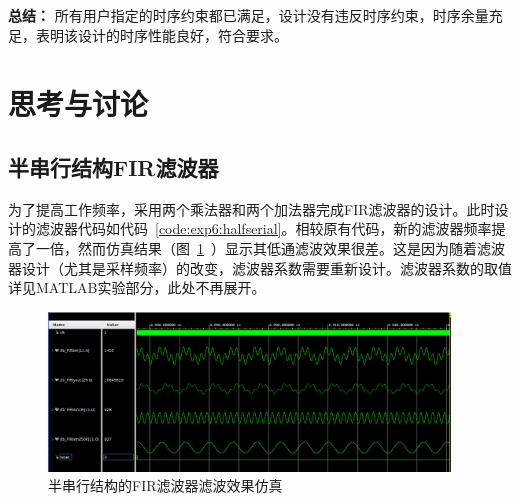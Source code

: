 \textbf{总结：}  
所有用户指定的时序约束都已满足，设计没有违反时序约束，时序余量充足，表明该设计的时序性能良好，符合要求。

\section{思考与讨论}
\subsection{半串行结构FIR滤波器}
为了提高工作频率，采用两个乘法器和两个加法器完成FIR滤波器的设计。此时设计的滤波器代码如代码~\ref{code:exp6:halfserial}。相较原有代码，新的滤波器频率提高了一倍，然而仿真结果（图~\ref{fig:half_serial}~）显示其低通滤波效果很差。这是因为随着滤波器设计（尤其是采样频率）的改变，滤波器系数需要重新设计。滤波器系数的取值详见MATLAB实验部分，此处不再展开。
\begin{figure}[htbp]
    \centering
    \includegraphics[width=0.95\textwidth]{figure/exp6/waveform_2adders.png}
    \caption{半串行结构的FIR滤波器滤波效果仿真}
    \label{fig:half_serial}
\end{figure}

